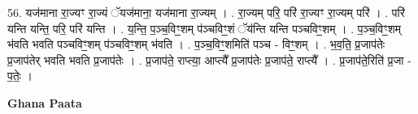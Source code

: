 \documentclass[17pt]{extarticle}
\begin{document}
56. यज॑माना रा॒ज्यꣳ रा॒ज्यं ॅयज॑माना॒ यज॑माना रा॒ज्यम् । . रा॒ज्यम् परि॒ परि॑ रा॒ज्यꣳ रा॒ज्यम् परि॑ । . परि॑ यन्ति यन्ति॒ परि॒ परि॑ यन्ति । . य॒न्ति॒ प॒ञ्च॒विꣳ॒॒शम् प॑ञ्चविꣳ॒॒शं ॅय॑न्ति यन्ति पञ्चविꣳ॒॒शम् । . प॒ञ्च॒विꣳ॒॒शम् भ॑वति भवति पञ्चविꣳ॒॒शम् प॑ञ्चविꣳ॒॒शम् भ॑वति । . प॒ञ्च॒विꣳ॒॒शमिति॑ पञ्च - विꣳ॒॒शम् । . भ॒व॒ति॒ प्र॒जाप॑तेः प्र॒जाप॑तेर् भवति भवति प्र॒जाप॑तेः । . प्र॒जाप॑ते॒ राप्त्या॒ आप्त्यै᳚ प्र॒जाप॑तेः प्र॒जाप॑ते॒ राप्त्यै᳚ । . प्र॒जाप॑ते॒रिति॑ प्र॒जा - प॒तेः॒ । \newline

\textbf{Ghana Paata } \newline
\end{document}
